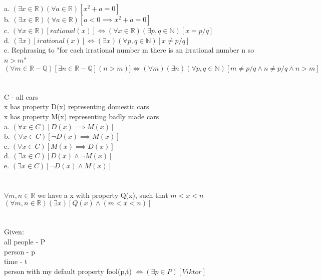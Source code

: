 \documentclass{article}
\begin{document}
\section{}
a. $(\exists x \in \mathbb{R})(\forall a \in \mathbb{R})[x^2 + a = 0]$ \\
b. $(\exists x \in \mathbb{R})(\forall a \in \mathbb{R})[a < 0 \implies x^2 + a = 0]$\\
c. $(\forall x \in \mathbb{R})[rational(x)] \Leftrightarrow (\forall x \in \mathbb{R})(\exists p,q \in \mathbb{N})[x = p/q]$\\
d. $(\exists x)[irational(x)] \Leftrightarrow (\exists x)(\forall p,q \in \mathbb{N})[x \neq p/q]$\\
e. Rephrasing to "for each irrational number m there is an irrational number n so $n > m$" \\
$(\forall m \in \mathbb{R} - \mathbb{Q})[\exists n \in \mathbb{R} - \mathbb{Q}](n > m)] \Leftrightarrow (\forall m)(\exists n)(\forall p,q \in \mathbb{N})[m \neq p/q \wedge n \neq p/q \wedge n > m]$ \\

\section{}
C - all cars \\
x has property D(x) representing domestic cars \\
x has property M(x) representing badly made cars \\
a. $(\forall x \in C)[D(x) \implies M(x)]$ \\
b. $(\forall x \in C)[\neg D(x) \implies M(x)]$ \\
c. $(\forall x \in C)[M(x) \implies D(x)]$ \\
d. $(\exists x \in C)[D(x) \wedge \neg M(x)]$ \\
e. $(\exists x \in C)[\neg D(x) \wedge M(x)]$ \\

\section{}
$\forall m,n \in \mathbb{R}$ we have a x with property Q(x), such that $m < x < n$ \\
$(\forall m,n \in \mathbb{R})(\exists x)[Q(x) \wedge (m < x < n)]$ \\

\section{}
Given: \\
all people - P \\
person - p \\
time - t \\
person with my default property fool(p,t) $\Leftrightarrow (\exists p \in P)[Viktor]$ \\
\end{document}
